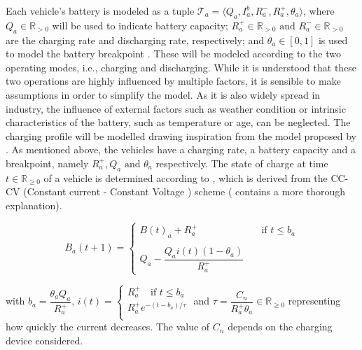 Each vehicle's battery is modeled as a tuple $\mathcal{T}_a =\langle Q_a, I^b_a, R^-_a, R^+_a,\theta_a\rangle$, where $Q_a \in \mathbb{R}_{>0}$ will be used to indicate battery capacity; $R^+_a \in \mathbb{R}_{>0}\text{ and } R^-_a\in \mathbb{R}_{>0}$ are the charging rate and discharging rate, respectively; and $\theta_a \in [0,1]$ is used to model the battery breakpoint . These will be modeled according to the two operating modes, i.e., charging and discharging. While it is understood that these two operations are highly influenced by multiple factors, it is sensible to make assumptions in order to simplify the model. 
As it is also widely spread in industry, the influence of external factors such as weather condition or intrinsic characteristics of the battery, such as temperature or age, can be neglected. The charging profile will be modelled drawing inspiration from the model proposed by . As mentioned above, the vehicles have a charging rate, a battery capacity and a breakpoint, namely $R^+_a, Q_a \text{ and } \theta_a$ respectively. The state of charge at time $t \in \mathbb{R}_{\ge0}$ of a vehicle is determined according to , which is derived from the CC-CV (Constant current - Constant Voltage ) scheme (\cite{LIU2020101342} contains a more thorough explanation).%




\begin{equation}
	B_a(t+1) = 
	\begin{cases} 
		B(t)_a + R^+_a & \quad \text{if } t \leq  b_a\\
		\\
		Q_a - \dfrac{Q_ai(t)(1-\theta_a)}{R^+_a}
		\end{cases}
		\label{eq:cc_cv}
\end{equation}

with $b_a = \dfrac{\theta_a Q_a}{R^+_a}$,  $i(t)= \begin{cases} R^+_a \quad \text{if } t \leq  b_a\\
	R^+_a e^{-(t-b_a)/\tau}\\ \end{cases}$ and $\tau= \dfrac{C_n}{R^+_a\theta_a}\in \mathbb{R}_{\ge0}$ representing how quickly the current decreases. The value of $C_n$ depends on the charging device considered.   \\
	
